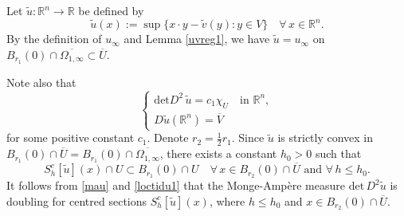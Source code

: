 \documentclass[11pt]{amsart}
\theoremstyle{plain}
\renewcommand{\det}{\mbox{det}}
\newcommand{\0}{\textbf{0}}
\numberwithin{equation}{section}
\numberwithin{equation}{section}
\numberwithin{figure}{section}
\begin{document}
Let \(\tilde u:\mathbb{R}^n \to \mathbb{R}\) be defined by
\begin{equation}\label{tildeu}
\tilde u(x) := \sup \{x \cdot y - \tilde v(y) : y \in V\} \quad \forall\, x \in \mathbb{R}^n.
\end{equation}
By the definition of \(u_\infty\) and Lemma \ref{uvreg1}, we have \(\tilde u = u_\infty\) on \(B_{r_1}(0) \cap \overline{\Omega_{1,\infty}} \subset \overline{U}\).

Note also that
\begin{equation}\label{mau}
\begin{cases}
\det D^2\, \tilde{u} = c_1\chi_{U} \quad \text{in } \mathbb{R}^n, \\
D\tilde{u}(\mathbb{R}^n) = \overline{V}
\end{cases}
\end{equation}
for some positive constant \( c_1 \).
Denote \(r_2 = \frac{1}{2}r_1\).
Since \(\tilde u\) is strictly convex in \(B_{r_1}(0) \cap \overline{U} = B_{r_1}(0) \cap \overline{\Omega_{1,\infty}}\), there exists a constant \(h_0 > 0\) such that
\begin{equation}\label{loctidu1}
S_h^c[\tilde u](x) \cap U \subset B_{r_1}(0) \cap U \quad \forall\, x \in B_{r_2}(0) \cap \overline{U} \text{ and } \forall\, h \leq h_0.
\end{equation}
It follows from  \eqref{mau} and \eqref{loctidu1} that the Monge-Amp\`ere measure $\det\, D^2 \tilde{u}$ is doubling for 
centred sections $S_h^c[\tilde u](x)$, where $h\leq h_0$ and $ x\in B_{r_2}(0) \cap \overline{U}.$
\end{document}
